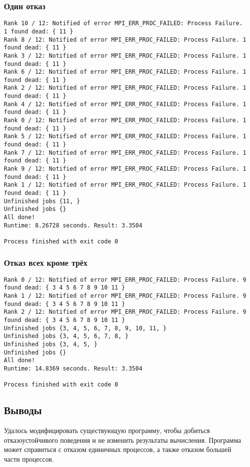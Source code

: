 \documentclass[a4paper,12pt,titlepage,finall]{article}
\begin{document}
\subsubsection{Один отказ}
\begin{lstlisting}
Rank 10 / 12: Notified of error MPI_ERR_PROC_FAILED: Process Failure. 1 found dead: { 11 }
Rank 8 / 12: Notified of error MPI_ERR_PROC_FAILED: Process Failure. 1 found dead: { 11 }
Rank 3 / 12: Notified of error MPI_ERR_PROC_FAILED: Process Failure. 1 found dead: { 11 }
Rank 6 / 12: Notified of error MPI_ERR_PROC_FAILED: Process Failure. 1 found dead: { 11 }
Rank 2 / 12: Notified of error MPI_ERR_PROC_FAILED: Process Failure. 1 found dead: { 11 }
Rank 4 / 12: Notified of error MPI_ERR_PROC_FAILED: Process Failure. 1 found dead: { 11 }
Rank 0 / 12: Notified of error MPI_ERR_PROC_FAILED: Process Failure. 1 found dead: { 11 }
Rank 5 / 12: Notified of error MPI_ERR_PROC_FAILED: Process Failure. 1 found dead: { 11 }
Rank 7 / 12: Notified of error MPI_ERR_PROC_FAILED: Process Failure. 1 found dead: { 11 }
Rank 9 / 12: Notified of error MPI_ERR_PROC_FAILED: Process Failure. 1 found dead: { 11 }
Rank 1 / 12: Notified of error MPI_ERR_PROC_FAILED: Process Failure. 1 found dead: { 11 }
Unfinished jobs {11, }
Unfinished jobs {}
All done!
Runtime: 8.26728 seconds. Result: 3.3504

Process finished with exit code 0
\end{lstlisting}

\subsubsection{Отказ всех кроме трёх}
\begin{lstlisting}
Rank 0 / 12: Notified of error MPI_ERR_PROC_FAILED: Process Failure. 9 found dead: { 3 4 5 6 7 8 9 10 11 }
Rank 1 / 12: Notified of error MPI_ERR_PROC_FAILED: Process Failure. 9 found dead: { 3 4 5 6 7 8 9 10 11 }
Rank 2 / 12: Notified of error MPI_ERR_PROC_FAILED: Process Failure. 9 found dead: { 3 4 5 6 7 8 9 10 11 }
Unfinished jobs {3, 4, 5, 6, 7, 8, 9, 10, 11, }
Unfinished jobs {3, 4, 5, 6, 7, 8, }
Unfinished jobs {3, 4, 5, }
Unfinished jobs {}
All done!
Runtime: 14.8369 seconds. Result: 3.3504

Process finished with exit code 0
\end{lstlisting}
\subsection{Выводы}
Удалось модифицировать существующую программу, чтобы добиться отказоустойчивого поведения и не изменить результаты вычисления. Программа может справиться с отказом единичных процессов, а также отказом большей части процессов.
\newpage
\end{document}

